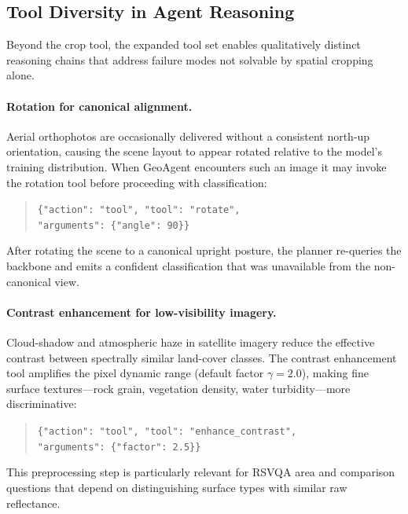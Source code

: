 \documentclass{article}
\begin{document}
\subsection{Tool Diversity in Agent Reasoning}

Beyond the crop tool, the expanded tool set enables qualitatively distinct
reasoning chains that address failure modes not solvable by spatial cropping alone.

\paragraph{Rotation for canonical alignment.}
Aerial orthophotos are occasionally delivered without a consistent north-up
orientation, causing the scene layout to appear rotated relative to the model's
training distribution.  When GeoAgent encounters such an image it may invoke the
rotation tool before proceeding with classification:
\begin{quote}
  \small\texttt{\{"action": "tool", "tool": "rotate",}\\
  \small\texttt{\phantom{\{}"arguments": \{"angle": 90\}\}}
\end{quote}
After rotating the scene to a canonical upright posture, the planner re-queries the
backbone and emits a confident classification that was unavailable from the
non-canonical view.

\paragraph{Contrast enhancement for low-visibility imagery.}
Cloud-shadow and atmospheric haze in satellite imagery reduce the effective contrast
between spectrally similar land-cover classes.  The contrast enhancement tool
amplifies the pixel dynamic range (default factor $\gamma = 2.0$), making fine
surface textures---rock grain, vegetation density, water turbidity---more
discriminative:
\begin{quote}
  \small\texttt{\{"action": "tool", "tool": "enhance\_contrast",}\\
  \small\texttt{\phantom{\{}"arguments": \{"factor": 2.5\}\}}
\end{quote}
This preprocessing step is particularly relevant for RSVQA area and comparison
questions that depend on distinguishing surface types with similar raw reflectance.
\end{document}
